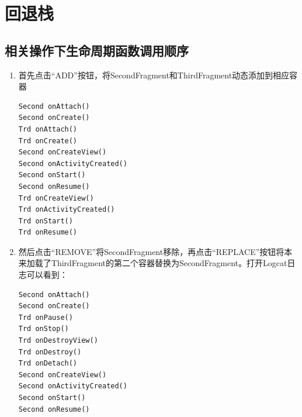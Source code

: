 \documentclass[9pt, b5paaper]{book}
\begin{document}
\section{回退栈}
\label{sec-2-9}
\subsection{相关操作下生命周期函数调用顺序}
\label{sec-2-9-1}
\begin{enumerate}
\item 首先点击“ADD”按钮，将SecondFragment和ThirdFragment动态添加到相应容器
\label{sec-2-9-1-1}
\begin{verbatim}
Second onAttach()
Second onCreate()
Trd onAttach()
Trd onCreate()
Second onCreateView()
Second onActivityCreated()
Second onStart()
Second onResume()
Trd onCreateView()
Trd onActivityCreated()
Trd onStart()
Trd onResume()
\end{verbatim}
\item 然后点击“REMOVE”将SecondFragment移除，再点击“REPLACE”按钮将本来加载了ThirdFragment的第二个容器替换为SecondFragment。打开Logcat日志可以看到：
\label{sec-2-9-1-2}
\begin{verbatim}
Second onAttach()
Second onCreate()
Trd onPause()
Trd onStop()
Trd onDestroyView()
Trd onDestroy()
Trd onDetach()
Second onCreateView()
Second onActivityCreated()
Second onStart()
Second onResume()
\end{verbatim}
\end{enumerate}
\end{document}
